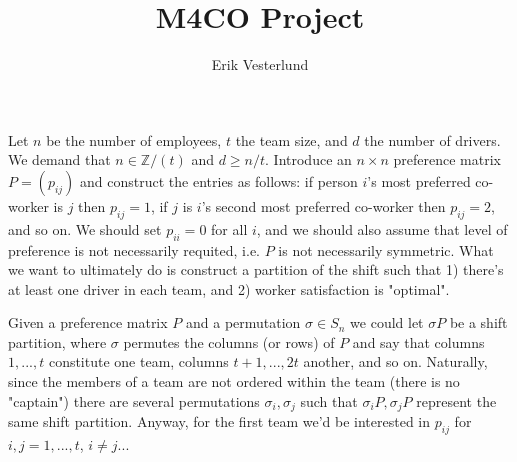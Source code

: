 \documentclass[a4paper, 11pt]{article}
\title{M4CO Project}
\author{Erik Vesterlund}
\begin{document}
\maketitle

Let $n$ be the number of employees, $t$ the team size, and $d$ the number of drivers. We demand that $n\in \mathbb{Z}/(t)$ and $d\geq n/t$. Introduce an $n\times n$ preference matrix $P = (p_{ij})$ and construct the entries as follows: if person $i$'s most preferred co-worker is $j$ then $p_{ij}=1$, if $j$ is $i$'s second most preferred co-worker then $p_{ij}=2$, and so on. We should set $p_{ii}=0$ for all $i$, and we should also assume that level of preference is not necessarily requited, i.e. $P$ is not necessarily symmetric. What we want to ultimately do is construct a partition of the shift such that 1) there's at least one driver in each team, and 2) worker satisfaction is "optimal".

Given a preference matrix $P$ and a permutation $\sigma \in S_n$ we could let $\sigma P$ be a shift partition, where $\sigma$ permutes the columns (or rows) of $P$ and say that columns $1,...,t$ constitute one team, columns $t+1,...,2t$ another, and so on. Naturally, since the members of a team are not ordered within the team (there is no "captain") there are several permutations $\sigma_i,\sigma_j$ such that $\sigma_i P,\sigma_j P$ represent the same shift partition. Anyway, for the first team we'd be interested in $p_{ij}$ for $i,j=1,...,t$, $i\neq j$...
\end{document}

